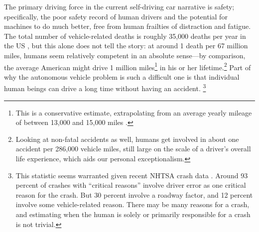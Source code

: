 The primary driving force in the current self-driving car
narrative is safety; specifically, the poor safety record of human
drivers and the potential for machines to do much better, free from
human frailties of distraction and fatigue. The total number of vehicle-related deaths is
roughly 35,000 deaths per year in the US \cite{censusDeaths}, but this alone 
does not tell the story: at around 1 death per 67 million miles, humans seem relatively
competent in an absolute sense---by comparison, the average American might
drive 1 million miles\footnote{This is a conservative estimate,
  extrapolating from an average yearly mileage of between 13,000 and
  15,000 miles \cite{fhwa}.} in his or her lifetime.\footnote{Looking at non-fatal
accidents as well, humans get involved in about one accident per
286,000 vehicle miles, still large on the scale of a driver's overall
life experience, which aids our personal exceptionalism.} Part of why
the autonomous vehicle problem is 
such a difficult one is that individual human beings can drive a long
time without having an accident. \footnote{This statistic seems warranted given recent NHTSA crash
  data \cite{NHTSAcrash}. Around 93 percent of crashes with ``critical
  reasons'' involve driver error as one critical reason for the crash.
  But 30 percent involve a roadway factor, and 12 percent involve some
vehicle-related reason. There may be many reasons for a crash, and
estimating when the human is solely or primarily responsible for a
crash is not trivial.}

